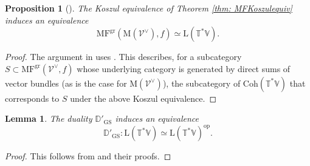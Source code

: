 \documentclass{amsart}
\newtheorem{lemma}[theorem]{Lemma}
\newtheorem{proposition}[theorem]{Proposition}
\theoremstyle{definition}
\theoremstyle{remark}
\numberwithin{equation}{section}
\newcommand{\mc}{\mathcal}
\newcommand{\op}{\mathrm{op}}
\newcommand{\D}{\mathbb{D}}
\newcommand{\Coh}{\mathrm{Coh}}
\newcommand{\GS}{\mathrm{GS}}
\newcommand{\V}{\mathbb{V}}
\newcommand{\T}{\mathbb{T}}
\DeclareMathOperator{\gr}{gr}
\newcommand{\MF}{\mathrm{MF}}
\newcommand{\mrL}{\mathrm{L}}
\newcommand{\M}{\mathrm{M}}
\begin{document}
\begin{proposition}[{\cite[Proposition 3.14]{PTDolbeault}}]{\label{prop: limkoszulequiv}}
    The Koszul equivalence of Theorem \ref{thm: MFKoszulequiv} induces an equivalence
\begin{equation*}
    \MF^{\gr}(\M(\mc{V}^{\vee}), f) \simeq \mrL(\T^{\ast}\V).
\end{equation*}
\end{proposition}
\begin{proof}
    The argument in \cite[Proposition 3.14]{PTDolbeault} uses \cite[Lemma 2.23]{PTqBPSsymquiverswithpotential}. This describes, for a subcategory $S \subset \MF^{\gr}(\mc{V}^{\vee}, f)$ whose underlying category is generated by direct sums of vector bundles (as is the case for $\M(\mc{V}^{\vee})$), the subcategory of $\Coh(\T^{\ast}\V)$ that corresponds to $S$ under the above Koszul equivalence.
\end{proof}

\begin{lemma}{\label{lem: limitselfdual}}
The duality $\D'_{\GS}$ induces an equivalence
\begin{equation*}
    \D'_{\GS}: \mrL(\T^{\ast}\V) \simeq \mrL(\T^{\ast}\V)^{\op}.
\end{equation*}
\end{lemma}
\begin{proof}
    This follows from \cite[Lemma 3.8, Lemma 3.9]{PTDolbeault} and their proofs.
\end{proof}
\end{document}
